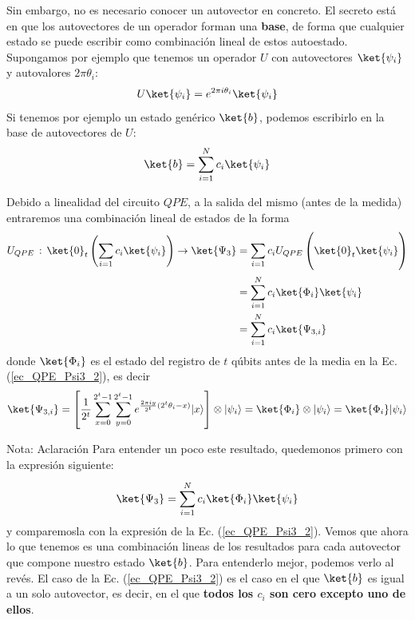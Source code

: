 \documentclass[a4paper,11pt]{book} %
\numberwithin{equation}{chapter}
\def\lc{\left[}
\def\rc{\right]}
\begin{document}
Sin embargo, no es necesario conocer un autovector en concreto. El secreto está en que los autovectores de un operador forman una \textbf{base}, de forma que cualquier estado se puede escribir como combinación lineal de estos autoestado. Supongamos por ejemplo que tenemos un operador $U$ con autovectores $\ket{\psi_i}$ y autovalores $2 \pi \theta_i$:
	\begin{equation} 
	U \ket{\psi_i} = e^{2 \pi i \theta_i} \ket{\psi_i}
	\end{equation}
Si tenemos por ejemplo un estado genérico $\ket{b}$, podemos escribirlo en la base de autovectores de $U$:
	\begin{equation} \label{ec_QPE_b_genérico}
	\ket{b} = \sum^N_{i=1} c_i \ket{\psi_i}
	\end{equation}

Debido a linealidad del circuito $QPE$, a la salida del mismo (antes de la medida) entraremos una combinación lineal de estados de la forma
	\begin{align*}
	U_{QPE}\, :\,\ket{0}_t \left(\sum_{i=1}c_i\ket{\psi_i}\right) \rightarrow \ket{\Psi_3} &= \sum_{i=1}c_i U_{QPE}\left(\ket{0}_t\ket{\psi_i} \rule{0mm}{7mm}\right)  \\ \rule{0mm}{7mm}
	& = \sum_{i=1}^N  c_i \ket{\Phi_i}\ket{\psi_i} \\ 
	& = \sum_{i=1}^N c_i \ket{\Psi_{3,i}}
	\end{align*}
donde $\ket{\Phi_i}$ es el estado del registro de $t$ qúbits antes de la media en la Ec. (\ref{ec_QPE_Psi3_2}), es decir
	\begin{equation}
	\ket{\Psi_{3,i}} = \lc \frac{1}{2^{t}} \sum_{x=0}^{2^t-1} \sum_{y=0}^{2^{t}-1}e^{\frac{2 \pi i y}{2^t} (2^t \theta_i - x)} |x\rangle \rc \otimes \vert\psi_i\rangle = \ket{\Phi_i} \otimes \vert\psi_i\rangle =  \ket{\Phi_i} \vert\psi_i\rangle
	\end{equation}

	\begin{mybox_blue}{Nota: Aclaración}	
	Para entender un poco este resultado, quedemonos primero con la expresión siguiente:
	\begin{equation} \label{ec_QPE_Psi_3_ci}
	\ket{\Psi_3}  = \sum_{i=1}^N  c_i \ket{\Phi_i}\ket{\psi_i} \\ \rule{0mm}{7mm}
	\end{equation}
	y comparemosla con la expresión de la Ec. (\ref{ec_QPE_Psi3_2}). Vemos que ahora lo que tenemos es una combinación lineas de los resultados para cada autovector que compone nuestro estado $\ket{b}$. Para entenderlo mejor, podemos verlo al revés. El caso de la Ec. (\ref{ec_QPE_Psi3_2}) es el caso en el que $\ket{b}$ es igual a un solo autovector, es decir, en el que \textbf{todos los $c_i$ son cero excepto uno de ellos}. 
	\end{mybox_blue}
\end{document}
